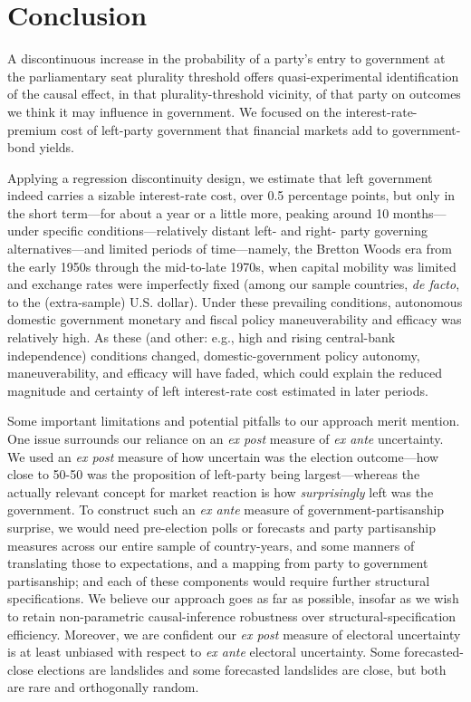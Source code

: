 \documentclass[12pt]{article}
\begin{document}
\section{Conclusion}

A discontinuous increase in the probability of a party's entry to government at the  parliamentary seat plurality threshold offers quasi-experimental identification of the causal effect, in that plurality-threshold vicinity, of that party on outcomes we think it may influence in government. We focused on the interest-rate-premium cost of left-party government that financial markets add to government-bond yields.

Applying a regression discontinuity design, we estimate that left government indeed carries a sizable interest-rate cost, over 0.5 percentage points, but only in the short term---for about a year or a little more, peaking around 10 months---under specific conditions---relatively distant left- and right- party governing alternatives---and limited periods of time---namely, the Bretton Woods era from the early 1950s through the mid-to-late 1970s, when capital mobility was limited and exchange rates were imperfectly fixed (among our sample countries, \textit{de facto}, to the (extra-sample) U.S. dollar). Under these prevailing conditions, autonomous domestic government monetary and fiscal policy maneuverability and efficacy was relatively high. As these (and other: e.g., high and rising central-bank independence) conditions changed, domestic-government policy autonomy, maneuverability, and efficacy will have faded, which could explain the reduced magnitude and certainty of left interest-rate cost estimated in later periods. 

Some important limitations and potential pitfalls to our approach merit mention. One issue surrounds our reliance on an \textit{ex post} measure of \textit{ex ante} uncertainty. We used an \textit{ex post} measure of how uncertain was the election outcome---how close to 50-50 was the proposition of left-party being largest---whereas the actually relevant concept for market reaction is how \textit{surprisingly} left was the government. To construct such an \textit{ex ante} measure of government-partisanship surprise, we would need pre-election polls or forecasts and party partisanship measures across our entire sample of country-years, and some manners of translating those to expectations, and a mapping from party to government partisanship; and each of these components would require further structural specifications. We believe our approach goes as far as possible, insofar as we wish to retain non-parametric causal-inference robustness over structural-specification efficiency. Moreover, we are confident our \textit{ex post} measure of electoral uncertainty is at least unbiased with respect to \textit{ex ante} electoral uncertainty. Some forecasted-close elections are landslides and some forecasted landslides are close, but both are rare and orthogonally random. 
\end{document}

